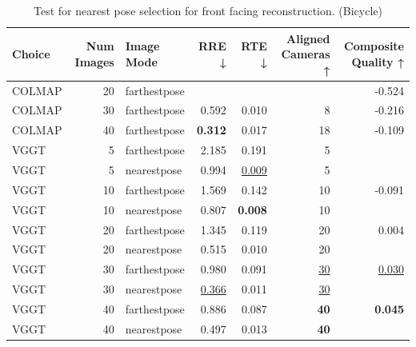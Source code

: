 \begin{table}[H]
\caption{Test for nearest pose selection for front facing reconstruction. (Bicycle)}
\label{tab:99_nearest_pose_bicycle}
\begin{tabular}{lrlrrrr}
\toprule
Choice & Num Images & Image Mode & RRE ↓ & RTE ↓ & Aligned Cameras ↑ & Composite Quality ↑ \\
\midrule
COLMAP & 20 & farthestpose &  &  &  & -0.524 \\
COLMAP & 30 & farthestpose & 0.592 & 0.010 & 8 & -0.216 \\
COLMAP & 40 & farthestpose & \textbf{0.312} & 0.017 & 18 & -0.109 \\
VGGT & 5 & farthestpose & 2.185 & 0.191 & 5 &  \\
VGGT & 5 & nearestpose & 0.994 & \underline{0.009} & 5 &  \\
VGGT & 10 & farthestpose & 1.569 & 0.142 & 10 & -0.091 \\
VGGT & 10 & nearestpose & 0.807 & \textbf{0.008} & 10 &  \\
VGGT & 20 & farthestpose & 1.345 & 0.119 & 20 & 0.004 \\
VGGT & 20 & nearestpose & 0.515 & 0.010 & 20 &  \\
VGGT & 30 & farthestpose & 0.980 & 0.091 & \underline{30} & \underline{0.030} \\
VGGT & 30 & nearestpose & \underline{0.366} & 0.011 & \underline{30} &  \\
VGGT & 40 & farthestpose & 0.886 & 0.087 & \textbf{40} & \textbf{0.045} \\
VGGT & 40 & nearestpose & 0.497 & 0.013 & \textbf{40} &  \\
\bottomrule
\end{tabular}
\end{table}
